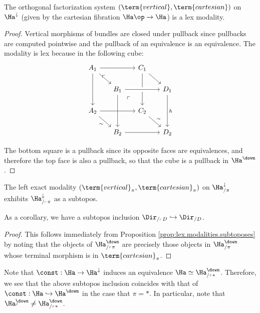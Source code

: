 \begin{lem}\label{lem:cartesian.modality}
The orthogonal factorization system $(\term{vertical}, \term{cartesian})$ on
$\Ha^{\downarrow}$ (given by the cartesian fibration $\Ha\op \to \Ha$) is a
lex modality.
\end{lem}
\begin{proof}

  Vertical morphisms of bundles are closed under pullback since pullbacks are
computed pointwise and the pullback of an equivalence is an equivalence. The
modality is lex because in the following cube:
\[
    \begin{tikzcd}[row sep=1.5em, column sep = 1.5em]
    A_1 \arrow[rr] \arrow[dr, crossing over] \arrow[dd,swap] \arrow[ddrr, phantom, "\ulcorner"
    very near start] &&
    C_1 \arrow[dd] \arrow[dr] \\
    & B_1 \arrow[rr, crossing over]\arrow[dd, crossing over] \arrow[ddrr,
    phantom, "\ulcorner" very near start]&&
    D_1 \arrow[dd,"h"] \\
    A_2 \arrow[rr,] \arrow[dr, "\sim"'] && C_2 \arrow[dr, "\sim"] \\
    & B_2 \arrow[rr] && D_2 
    \end{tikzcd}
\]

The bottom square is a pullback since its opposite faces are equivalences, and
therefore the top face is also a pullback, so that the cube is a pullback in $\Ha^{\down}$.
\end{proof}

\begin{thm}
The left exact modality $(\term{vertical}_{\pi}, \term{cartesian}_{\pi})$ on
$\Ha^{\downarrow}_{/\pi}$ exhibits $\Ha^{\downarrow}_{/_{\ulcorner} \pi}$ as a
subtopos.

As a corollary, we have a subtopos inclusion $\Dir_{/_{\ulcorner} D}
\hookrightarrow \Dir_{/D}$. 
\end{thm}
\begin{proof}
This follows immediately from Proposition \ref{prop:lex.modalities.subtoposes} by
noting that the objects of $\Ha^{\down}_{/_{\ulcorner} \pi}$ are precisely those objects
in $\Ha^{\down}_{/\pi}$ whose terminal morphism is in $\term{cartesian}_{\pi}$.
\end{proof}

\begin{rmk}
Note that $\const : \Ha \to \Ha^{\downarrow}$ induces an equivalence $\Ha \simeq
\Ha^{\down}_{/_{\ulcorner} \ast}$. Therefore, we see that the above subtopos
inclusion coincides with that of $\const : \Ha \hookrightarrow \Ha^{\down}$ in
the case that $\pi = \ast$. In particular, note that $\Ha^{\down}_{\ulcorner}
\neq \Ha^{\down}_{/_{\ulcorner} \ast}$.
\end{rmk}

